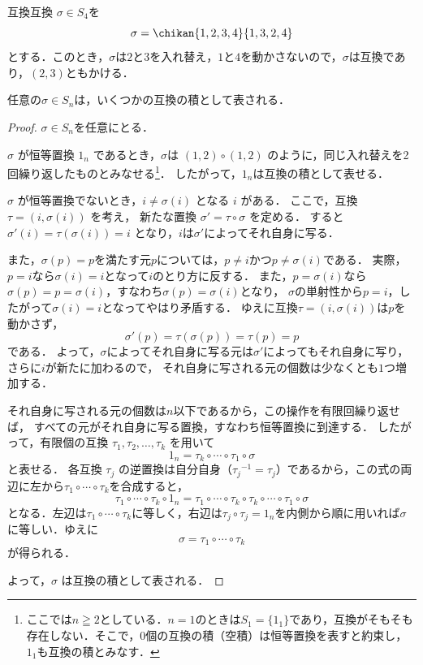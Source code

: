 \begin{example}{互換}{互換}
  $\sigma \in S_4$を
  \[
  \sigma = \chikan{1, 2, 3, 4}{1, 3, 2, 4}
  \]
  とする．このとき，$\sigma$は$2$と$3$を入れ替え，$1$と$4$を動かさないので，$\sigma$は互換であり，$(2,3)$ともかける．
\end{example}

\begin{prop}{}{}
  任意の$\sigma \in S_n$は，いくつかの互換の積として表される．
\end{prop}


\begin{leftbar}
  \begin{proof}
     $\sigma \in S_n$を任意にとる．

     $\sigma$ が恒等置換 $1_n$ であるとき，$\sigma$は $(1, 2) \circ (1, 2)$ のように，同じ入れ替えを2回繰り返したものとみなせる\footnote{ここでは$n \geqq 2$としている．$n = 1$のときは$S_1 = \{1_1\}$であり，互換がそもそも存在しない．そこで，$0$個の互換の積（空積）は恒等置換を表すと約束し，$1_1$も互換の積とみなす．}．
     したがって，$1_n$は互換の積として表せる．
     
    $\sigma$ が恒等置換でないとき，$i \ne \sigma(i)$ となる $i$ がある．
    ここで，互換 $\tau = (i, \sigma(i))$ を考え，
    新たな置換 $\sigma' = \tau \circ \sigma$ を定める．
    すると$\sigma'(i) = \tau(\sigma(i)) = i$ となり，$i$は$\sigma'$によってそれ自身に写る．

    また，$\sigma(p) = p$を満たす元$p$については，$p \ne i$かつ$p \ne \sigma(i)$である．
    実際，$p = i$なら$\sigma(i) = i$となって$i$のとり方に反する．
    また，$p = \sigma(i)$なら$\sigma(p) = p = \sigma(i)$，すなわち$\sigma(p) = \sigma(i)$となり，
    $\sigma$の単射性から$p = i$，したがって$\sigma(i) = i$となってやはり矛盾する．
    ゆえに互換$\tau = (i, \sigma(i))$は$p$を動かさず，
    \[
      \sigma'(p) = \tau(\sigma(p)) = \tau(p) = p
    \]
    である．
    よって，$\sigma$によってそれ自身に写る元は$\sigma'$によってもそれ自身に写り，さらに$i$が新たに加わるので，
    それ自身に写される元の個数は少なくとも$1$つ増加する．

    それ自身に写される元の個数は$n$以下であるから，この操作を有限回繰り返せば，
    すべての元がそれ自身に写る置換，すなわち恒等置換に到達する．
    したがって，有限個の互換 $\tau_1, \tau_2, \dots, \tau_k$ を用いて
    \[
      1_n = \tau_k \circ \cdots \circ \tau_1 \circ \sigma
    \]
    と表せる．
    各互換 $\tau_j$ の逆置換は自分自身（${\tau_j}^{-1} = \tau_j$）であるから，この式の両辺に左から$\tau_1 \circ \cdots \circ \tau_k$を合成すると，
    \[
      \tau_1 \circ \cdots \circ \tau_k \circ 1_n
      = \tau_1 \circ \cdots \circ \tau_k \circ \tau_k \circ \cdots \circ \tau_1 \circ \sigma
    \]
    となる．左辺は$\tau_1 \circ \cdots \circ \tau_k$に等しく，右辺は$\tau_j \circ \tau_j = 1_n$を内側から順に用いれば$\sigma$に等しい．ゆえに
    \[
      \sigma = \tau_1 \circ \cdots \circ \tau_k
    \]
    が得られる．

よって，$\sigma$ は互換の積として表される．
  \end{proof}
\end{leftbar}

